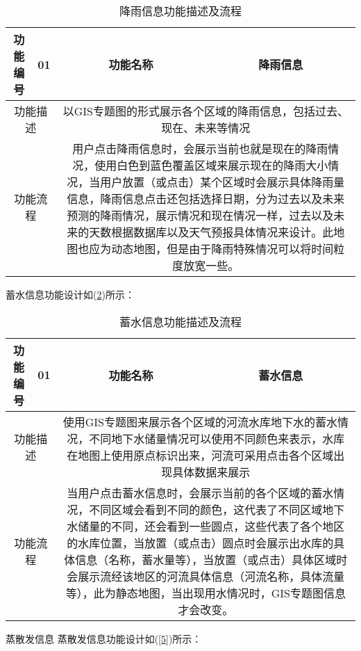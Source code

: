 \begin{table}[H]
	\centering
	\caption[降雨信息]{降雨信息功能描述及流程}
	\label{3}
	\begin{tabular}{|c|c|c|c|}
		
		\hline
		功能编号&01&功能名称&降雨信息\\
		\hline
		\multicolumn{2}{|c|}{功能描述}&\multicolumn{2}{c|}{\multirow{1}{0.7\textwidth}{以GIS专题图的形式展示各个区域的降雨信息，包括过去、现在、未来等情况}}\\[10ex]
		\hline
		\multicolumn{2}{|c|}{功能流程}&\multicolumn{2}{c|}{\multirow{1}{0.7\textwidth}{用户点击降雨信息时，会展示当前也就是现在的降雨情况，使用白色到蓝色覆盖区域来展示现在的降雨大小情况，当用户放置（或点击）某个区域时会展示具体降雨量信息，降雨信息点击还包括选择日期，分为过去以及未来预测的降雨情况，展示情况和现在情况一样，过去以及未来的天数根据数据库以及天气预报具体情况来设计。此地图也应为动态地图，但是由于降雨特殊情况可以将时间粒度放宽一些。}}\\[16ex]
		\hline
		
		
	\end{tabular}
\end{table}
蓄水信息功能设计如(\ref{4})所示：

\begin{table}[H]
	\centering
	\caption[蓄水信息]{蓄水信息功能描述及流程}
	\label{4}
	\begin{tabular}{|c|c|c|c|}
		
		\hline
		功能编号&01&功能名称&蓄水信息\\
		\hline
		\multicolumn{2}{|c|}{功能描述}&\multicolumn{2}{c|}{\multirow{1}{0.7\textwidth}{使用GIS专题图来展示各个区域的河流水库地下水的蓄水情况，不同地下水储量情况可以使用不同颜色来表示，水库在地图上使用原点标识出来，河流可采用点击各个区域出现具体数据来展示}}\\[10ex]
		\hline
		\multicolumn{2}{|c|}{功能流程}&\multicolumn{2}{c|}{\multirow{1}{0.7\textwidth}{当用户点击蓄水信息时，会展示当前的各个区域的蓄水情况，不同区域会看到不同的颜色，这代表了不同区域地下水储量的不同，还会看到一些圆点，这些代表了各个地区的水库位置，当放置（或点击）圆点时会展示出水库的具体信息（名称，蓄水量等），当放置（或点击）具体区域时会展示流经该地区的河流具体信息（河流名称，具体流量等），此为静态地图，当出现用水情况时，GIS专题图信息才会改变。}}\\[16ex]
		\hline
		
		
	\end{tabular}
\end{table}
蒸散发信息
蒸散发信息功能设计如(\ref{5})所示：

